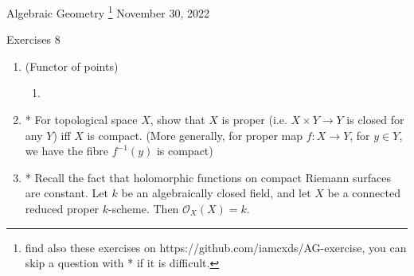 \documentclass[a4paper,11pt]{article}
\begin{document}
{\small Algebraic Geometry
\footnote{find also these exercises on https://github.com/iamcxds/AG-exercise, you can skip a question with * if it is difficult.}
 \hfill November 30, 2022 \\}
\begin{center}
\Huge Exercises 8
\end{center}


\vskip0.6cm


\begin{enumerate}[1.]

\item (Functor of points)
\begin{enumerate}
    \item 
\end{enumerate}
\item* For topological space $X$, show that $X$ is proper (i.e. $X\times Y\to Y$ is closed for any $Y$) iff $X$ is compact. (More generally, for proper map $f:X\to Y$, for $y\in Y$, we have the fibre $f^{-1}(y)$ is compact)
\item* Recall the fact that holomorphic functions on compact Riemann surfaces are constant. Let $k$ be an algebraically closed field, and let  $X$ be a connected reduced proper $k$-scheme. Then $\mathcal{O}_X(X)=k$.
\end{enumerate}
\end{document}
